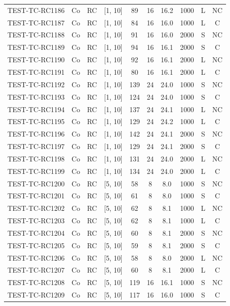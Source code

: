 \begin{longtable}{lccccccccc}
TEST-TC-RC1186 & Co & RC & [1, 10] & 89 & 16 & 16.2 & 1000 & L & NC \\
TEST-TC-RC1187 & Co & RC & [1, 10] & 84 & 16 & 16.0 & 1000 & L & C \\
TEST-TC-RC1188 & Co & RC & [1, 10] & 91 & 16 & 16.0 & 2000 & S & NC \\
TEST-TC-RC1189 & Co & RC & [1, 10] & 94 & 16 & 16.1 & 2000 & S & C \\
TEST-TC-RC1190 & Co & RC & [1, 10] & 92 & 16 & 16.1 & 2000 & L & NC \\
TEST-TC-RC1191 & Co & RC & [1, 10] & 80 & 16 & 16.1 & 2000 & L & C \\
TEST-TC-RC1192 & Co & RC & [1, 10] & 139 & 24 & 24.0 & 1000 & S & NC \\
TEST-TC-RC1193 & Co & RC & [1, 10] & 124 & 24 & 24.0 & 1000 & S & C \\
TEST-TC-RC1194 & Co & RC & [1, 10] & 137 & 24 & 24.1 & 1000 & L & NC \\
TEST-TC-RC1195 & Co & RC & [1, 10] & 129 & 24 & 24.2 & 1000 & L & C \\
TEST-TC-RC1196 & Co & RC & [1, 10] & 142 & 24 & 24.1 & 2000 & S & NC \\
TEST-TC-RC1197 & Co & RC & [1, 10] & 129 & 24 & 24.1 & 2000 & S & C \\
TEST-TC-RC1198 & Co & RC & [1, 10] & 131 & 24 & 24.0 & 2000 & L & NC \\
TEST-TC-RC1199 & Co & RC & [1, 10] & 134 & 24 & 24.0 & 2000 & L & C \\
TEST-TC-RC1200 & Co & RC & [5, 10] & 58 & 8 & 8.0 & 1000 & S & NC \\
TEST-TC-RC1201 & Co & RC & [5, 10] & 61 & 8 & 8.0 & 1000 & S & C \\
TEST-TC-RC1202 & Co & RC & [5, 10] & 62 & 8 & 8.1 & 1000 & L & NC \\
TEST-TC-RC1203 & Co & RC & [5, 10] & 62 & 8 & 8.1 & 1000 & L & C \\
TEST-TC-RC1204 & Co & RC & [5, 10] & 60 & 8 & 8.1 & 2000 & S & NC \\
TEST-TC-RC1205 & Co & RC & [5, 10] & 59 & 8 & 8.1 & 2000 & S & C \\
TEST-TC-RC1206 & Co & RC & [5, 10] & 58 & 8 & 8.0 & 2000 & L & NC \\
TEST-TC-RC1207 & Co & RC & [5, 10] & 60 & 8 & 8.1 & 2000 & L & C \\
TEST-TC-RC1208 & Co & RC & [5, 10] & 119 & 16 & 16.1 & 1000 & S & NC \\
TEST-TC-RC1209 & Co & RC & [5, 10] & 117 & 16 & 16.0 & 1000 & S & C \\

\end{longtable}
